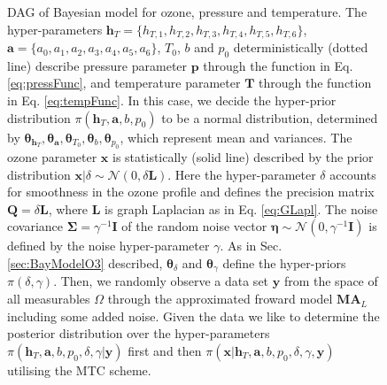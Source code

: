 \begin{figure}[thb!]
	\caption[Directed acyclic graph of Bayesian model for ozone, pressure and temperature.]{DAG of Bayesian model for ozone, pressure and temperature. The hyper-parameters $\bm{h}_T= \{ h_{T,1}, h_{T,2},h_{T,3},h_{T,4},h_{T,5},h_{T,6}\}$, $\bm{a} = \{ a_0, a_1, a_2,a_3,a_4,a_5,a_6\}$, $T_0$, $b$ and $p_0$ deterministically (dotted line) describe pressure parameter $\bm{p}$ through the function in Eq. \ref{eq:pressFunc}, and temperature parameter $\bm{T}$ through the function in Eq. \ref{eq:tempFunc}.
	In this case, we decide the hyper-prior distribution $\pi(\bm{h}_T,\bm{a},b, p_0)$ to be a normal distribution, determined by $\bm{\theta}_{\bm{h}_T},\bm{\theta}_{\bm{a}}, \bm{\theta}_{T_{0}},\bm{\theta}_{b} , \bm{\theta}_{p_0}$, which represent mean and variances. 
	The ozone parameter $\bm{x}$ is statistically (solid line) described by the prior distribution $\bm{x}| \delta \sim \mathcal{N}(0,\delta \bm{L}) $. 
	Here the hyper-parameter $\delta$ accounts for smoothness in the ozone profile and defines the precision matrix $\bm{Q} = \delta \bm{L}$, where $\bm{L}$ is graph Laplacian as in Eq. \ref{eq:GLapl}.
	The noise covariance $\bm{\Sigma} = \gamma^{-1} \bm{I}$ of the random noise vector $\bm{\eta} \sim \mathcal{N}(0,\gamma^{-1} \bm{I} ) $ is defined by the noise hyper-parameter $\gamma$.
	As in Sec. \ref{sec:BayModelO3} described, $\bm{\theta}_{\delta}$ and $\bm{\theta}_{\gamma}$ define the hyper-priors $\pi(\delta, \gamma)$.
	Then, we randomly observe a data set $\bm{y}$ from the space of all measurables $\Omega$ through the approximated froward model $\bm{M}\bm{A}_L$ including some added noise.
	Given the data we like to determine the posterior distribution over the hyper-parameters $\pi(\bm{h}_T,\bm{a},b, p_0, \delta, \gamma | \bm{y})$ first and then $\pi(\bm{x}|\bm{h}_T,\bm{a},b, p_0, \delta, \gamma, \bm{y})$ utilising the MTC scheme.}
	\label{fig:DAGComplete}
\end{figure}

